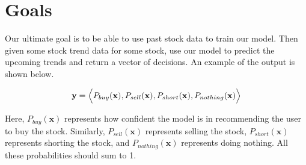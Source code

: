 \documentclass[final]{article}
\begin{document}
\section{Goals}

Our ultimate goal is to be able to use past stock data to train our model. Then
given some stock trend data for some stock, use our model to predict the
upcoming trends and return a vector of decisions. An example of the output is
shown below.

$$\mathbf{y} = \Bigl<P_{buy}(\mathbf{x}), P_{sell}(\mathbf{x}),
P_{short}(\mathbf{x}), P_{nothing}(\mathbf{x})\Bigr>$$

Here, $P_{buy}(\mathbf{x})$ represents how confident the model is in
recommending the user to buy the stock. Similarly, $P_{sell}(\mathbf{x})$
represents selling the stock, $P_{short}(\mathbf{x})$ represents shorting the
stock, and $P_{nothing}(\mathbf{x})$ represents doing nothing. All these
probabilities should sum to 1.
\end{document}
